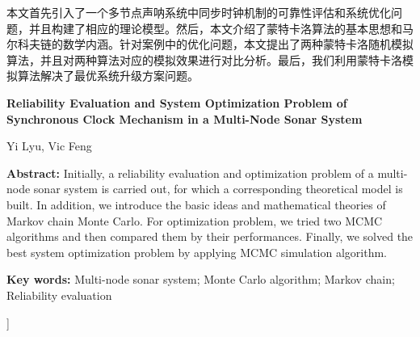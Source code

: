 \documentclass[10.5pt,twocolumn]{jbuaa}
\begin{document}
  \begin{@twocolumnfalse}
  \maketitle
\begin{CAbstractJBUAA}
本文首先引入了一个多节点声呐系统中同步时钟机制的可靠性评估和系统优化问题，并且构建了相应的理论模型。然后，本文介绍了蒙特卡洛算法的基本思想和马尔科夫链的数学内涵。针对案例中的优化问题，本文提出了两种蒙特卡洛随机模拟算法，并且对两种算法对应的模拟效果进行对比分析。最后，我们利用蒙特卡洛模拟算法解决了最优系统升级方案问题。
\end{CAbstractJBUAA}
\begin{center}
\parbox{\textwidth}{
\setlength{\parindent}{1em}
{
\centering\sihao\textbf{Reliability Evaluation and System Optimization Problem of Synchronous Clock Mechanism in a Multi-Node Sonar System}\\
} 
\vspace{-1.2mm}
\begin{center}
\wuhao Yi Lyu, Vic Feng\\[-0.1cm]
\end{center}

\wuhao
{
\textbf{Abstract:} 
Initially, a reliability evaluation and optimization problem of a multi-node sonar system is carried out, for which a corresponding theoretical model is built. In addition, we introduce the basic ideas and mathematical theories of Markov chain Monte Carlo. For optimization problem, we tried two MCMC algorithms and then compared them by their performances. Finally, we solved the best system optimization problem by applying MCMC simulation algorithm.

\textbf{Key words:} Multi-node sonar system; Monte Carlo algorithm; Markov chain; Reliability evaluation}
}
\end{center}

  \end{@twocolumnfalse}
]
\wuhao 
\end{document}
